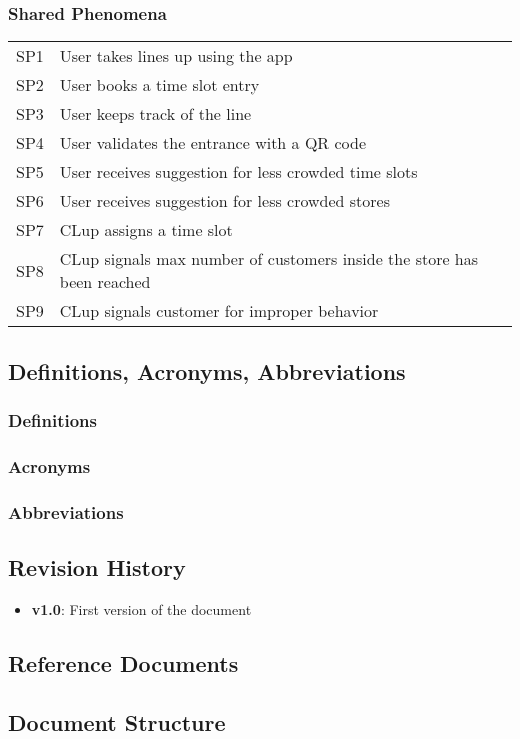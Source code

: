 \subsubsection{Shared Phenomena}
\begin{tabular}{l|l}
	SP1 & User takes lines up using the app\\
	SP2 & User books a time slot entry\\
	SP3 & User keeps track of the line\\
	SP4 & User validates the entrance with a QR code\\
	SP5 & User receives suggestion for less crowded time slots\\
	SP6 & User receives suggestion for less crowded stores\\
	SP7 & CLup assigns a time slot \\
	SP8 & CLup signals max number of customers inside the store has been reached \\
	SP9 & CLup signals customer for improper behavior\\
	
\end{tabular}

\subsection{Definitions, Acronyms, Abbreviations}

\subsubsection{Definitions}

\subsubsection{Acronyms}

\subsubsection{Abbreviations}


\subsection{Revision History}
\begin{itemize}
	\item
	\textbf{v1.0}: First version of the document
\end{itemize}


\subsection{Reference Documents}

\subsection{Document Structure}


